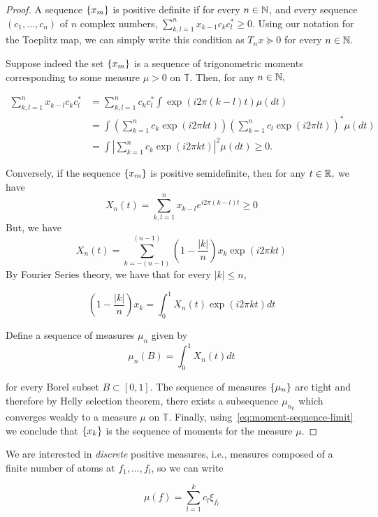 \begin{proof}

A sequence $\left\{ x_m \right\}$ is positive definite if for every $n \in \mathbb{N}$, and every
sequence $(c_1, \ldots, c_n)$ of $n$ complex numbers, $\sum_{k,l=1}^n x_{k-1}
c_k c_l^* \geq 0.$ Using our notation for the Toeplitz map, we can simply write
this condition as $T_n x \succeq 0$ for every $n \in \mathbb{N}.$

Suppose indeed the set $\left\{ x_m \right\}$ is a sequence of trigonometric moments
corresponding to some measure $\mu > 0$ on $\mathbb{T}.$ Then, for any $n \in
\mathbb{N},$

\begin{align*}
	\sum_{k,l=1}^n x_{k-l} c_k c_l^* &= \sum_{k,l=1}^n c_k c_l^* \int \exp(i 2 \pi (k-l) t ) \mu (dt)\\
	&= \int \left(\sum_{k=1}^n c_k \exp(i 2 \pi k t) \right) \left(\sum_{k=1}^n c_l \exp(i 2 \pi l t) \right)^* \mu (dt) \\
	&= \int \left|\sum_{k=1}^n c_k \exp(i 2 \pi k t) \right|^2 \mu (dt) \geq 0.
\end{align*}

Conversely, if the sequence $\left\{ x_m \right\}$ is positive semidefinite, then for any $t \in \mathbb{R},$  we have
\[
X_n(t) = \sum_{k,l=1}^n x_{k-l} e^{i 2 \pi (k-l) t} \geq 0
\]
But, we have
\[
	X_n(t) = \sum_{k=-(n-1)}^{(n-1)} \left( 1 - \frac{|k|}{n}\right) x_k \exp(i 2\pi k t)
\]
By Fourier Series theory, we have that for every $|k| \leq n,$

\begin{equation}
	\label{eq:moment-sequence-limit}
	\left( 1 - \frac{|k|}{n} \right) x_k = \int_0^1 X_n(t) \exp(i 2\pi k t ) d t
\end{equation}

Define a sequence of measures $\mu_n$ given by
\[
	\mu_n(B) = \int_0^1 X_n(t) d t
\]

for every Borel subset $B \subset [0,1].$ The sequence of measures $\left\{ \mu_n \right\}$
are tight and therefore by Helly selection theorem, there exists a subsequence
$\mu_{n_k}$ which converges weakly to a measure $\mu$ on $\mathbb{T}.$ Finally, using~\ref{eq:moment-sequence-limit} we conclude that $\left\{ x_k \right\}$ is the sequence of moments for the measure $\mu.$
\end{proof}

We are interested in \emph{discrete} positive measures, i.e., measures composed
of a finite number of atoms at $f_1, \ldots, f_l$, so we can write

\[
\mu(f) = \sum_{l=1}^k c_l \xi_{f_l}
\]

